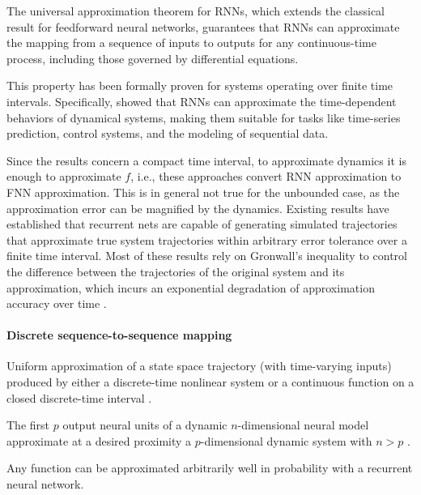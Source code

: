 \documentclass{article}
\theoremstyle{definition}
\theoremstyle{remark}
\begin{document}
The universal approximation theorem for RNNs, which extends the classical result for feedforward neural networks, guarantees that RNNs can approximate the mapping from a sequence of inputs to outputs for any continuous-time process, including those governed by differential equations.

This property has been formally proven for systems operating over finite time intervals. Specifically, \citet{funahashi1993approximation} showed that RNNs can approximate the time-dependent behaviors of dynamical systems, making them suitable for tasks like time-series prediction, control systems, and the modeling of sequential data.

Since the results concern a compact time interval, to approximate dynamics it is enough to approximate $f$, i.e., these approaches convert RNN approximation to FNN approximation.
This is in general not true for the unbounded case, as the approximation error can be magnified by the dynamics.
Existing results have established that recurrent nets are capable of generating simulated trajectories that approximate true system trajectories within arbitrary error tolerance over a finite time interval.
Most of these results rely on Gr\:onwall’s inequality to control the difference between the trajectories of the original system and its approximation, which incurs an exponential degradation of approximation accuracy over time
\citep{sontag1992neural, sontag1998learning, funahashi1993approximation,chow2000modeling, li2005approximation}.

\paragraph{Discrete sequence-to-sequence mapping}
Uniform approximation of a state space trajectory (with time-varying inputs) produced by either a discrete-time nonlinear system or a continuous function on a closed discrete-time interval \citep{jin1995universal}.

The first $p$ output neural units of a dynamic $n$-dimensional neural model approximate at a desired proximity a $p$-dimensional dynamic system with $n > p$ \citep{kambhampati2000approximation}.

Any function can be approximated arbitrarily well in probability with a recurrent neural network\citep{hammer2000approximation}. 
\end{document}
